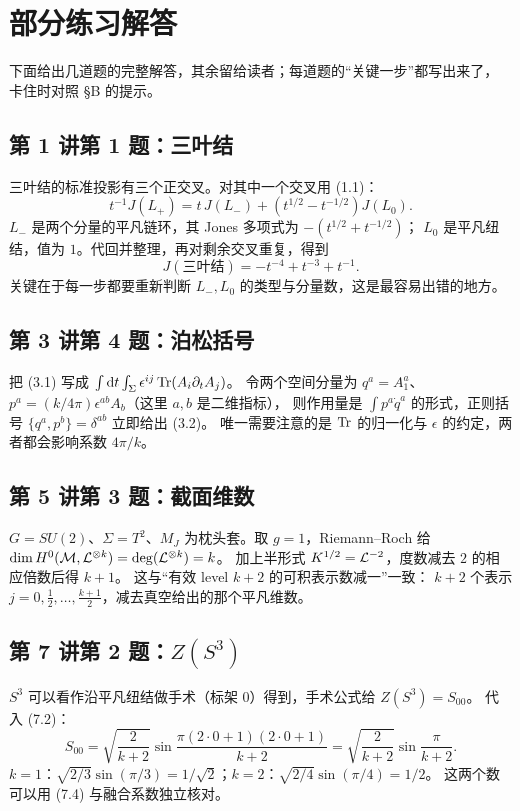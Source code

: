 \section{部分练习解答}

下面给出几道题的完整解答，其余留给读者；每道题的“关键一步”都写出来了，
卡住时对照 \S B 的提示。

\subsection*{第 1 讲第 1 题：三叶结}

三叶结的标准投影有三个正交叉。对其中一个交叉用 (1.1)：
\[
t^{-1}J(L_+)=t\,J(L_-)+(t^{1/2}-t^{-1/2})J(L_0).
\]
$L_-$ 是两个分量的平凡链环，其 Jones 多项式为 $-(t^{1/2}+t^{-1/2})$；
$L_0$ 是平凡纽结，值为 $1$。代回并整理，再对剩余交叉重复，得到
\[
J(\text{三叶结})=-t^{-4}+t^{-3}+t^{-1}.
\]
关键在于每一步都要重新判断 $L_-,L_0$ 的类型与分量数，这是最容易出错的地方。

\subsection*{第 3 讲第 4 题：泊松括号}

把 (3.1) 写成 $\int\mathrm{d} t\int_\Sigma \epsilon^{ij}\operatorname{Tr}(A_i\partial_tA_j)$。
令两个空间分量为 $q^a=A_1^a$、$p^a=(k/4\pi)\epsilon^{ab}A_b$（这里 $a,b$ 是二维指标），
则作用量是 $\int p^a\dot q^a$ 的形式，正则括号 $\{q^a,p^b\}=\delta^{ab}$ 立即给出 (3.2)。
唯一需要注意的是 $\operatorname{Tr}$ 的归一化与 $\epsilon$ 的约定，两者都会影响系数 $4\pi/k$。

\subsection*{第 5 讲第 3 题：截面维数}

$G=SU(2)$、$\Sigma=T^2$、$M_J$ 为枕头套。取 $g=1$，Riemann--Roch 给
$\dim H^0(\mathcal{M},\mathcal{L}^{\otimes k})=\deg(\mathcal{L}^{\otimes k})=k$。
加上半形式 $K^{1/2}=\mathcal{L}^{-2}$，度数减去 $2$ 的相应倍数后得 $k+1$。
这与“有效 level $k+2$ 的可积表示数减一”一致：
$k+2$ 个表示 $j=0,\frac12,\dots,\frac{k+1}{2}$，减去真空给出的那个平凡维数。

\subsection*{第 7 讲第 2 题：$Z(S^3)$}

$S^3$ 可以看作沿平凡纽结做手术（标架 $0$）得到，手术公式给 $Z(S^3)=S_{00}$。
代入 (7.2)：
\[
S_{00}=\sqrt{\frac{2}{k+2}}\sin\frac{\pi(2\cdot0+1)(2\cdot0+1)}{k+2}
=\sqrt{\frac{2}{k+2}}\sin\frac{\pi}{k+2}.
\]
$k=1$：$\sqrt{2/3}\sin(\pi/3)=1/\sqrt2$；$k=2$：$\sqrt{2/4}\sin(\pi/4)=1/2$。
这两个数可以用 (7.4) 与融合系数独立核对。

